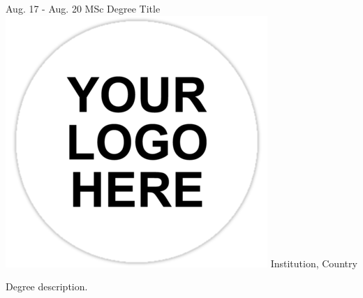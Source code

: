 \documentclass[american]{cv-class}
\begin{document}
\begin{entrylist}
{	\href{https://yourDiploma.com}{}
	}
	
	\entry
	{Aug. 17 - Aug. 20}
	{MSc Degree Title}
	{{\includegraphics[scale=0.05]{img/generic-logo.png}} Institution, Country} 
	{\justifying Degree description.

}
\end{entrylist}
\end{document}

